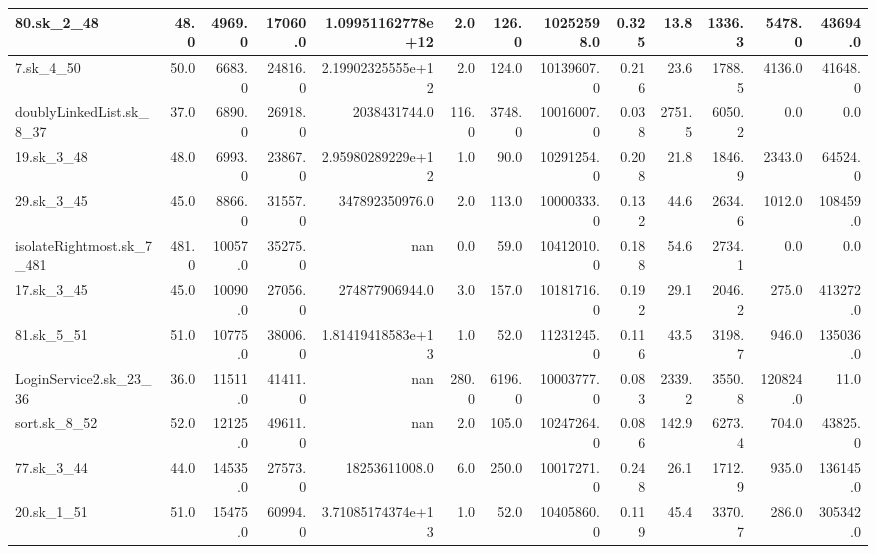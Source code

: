 \begin{tabular}{|l r r r r| r r r r r r | r r|}
\hline
80.sk\_2\_48 & 48.0 & 4969.0 & 17060.0 & 1.09951162778e+12 & 2.0 & 126.0 & 10252598.0 & 0.325 & 13.8 & 1336.3 & 5478.0 & 43694.0 \\
\hline
7.sk\_4\_50 & 50.0 & 6683.0 & 24816.0 & 2.19902325555e+12 & 2.0 & 124.0 & 10139607.0 & 0.216 & 23.6 & 1788.5 & 4136.0 & 41648.0 \\
\hline
doublyLinkedList.sk\_8\_37 & 37.0 & 6890.0 & 26918.0 & 2038431744.0 & 116.0 & 3748.0 & 10016007.0 & 0.038 & 2751.5 & 6050.2 & 0.0 & 0.0 \\
\hline
19.sk\_3\_48 & 48.0 & 6993.0 & 23867.0 & 2.95980289229e+12 & 1.0 & 90.0 & 10291254.0 & 0.208 & 21.8 & 1846.9 & 2343.0 & 64524.0 \\
\hline
29.sk\_3\_45 & 45.0 & 8866.0 & 31557.0 & 347892350976.0 & 2.0 & 113.0 & 10000333.0 & 0.132 & 44.6 & 2634.6 & 1012.0 & 108459.0 \\
\hline
isolateRightmost.sk\_7\_481 & 481.0 & 10057.0 & 35275.0 & nan & 0.0 & 59.0 & 10412010.0 & 0.188 & 54.6 & 2734.1 & 0.0 & 0.0 \\
\hline
17.sk\_3\_45 & 45.0 & 10090.0 & 27056.0 & 274877906944.0 & 3.0 & 157.0 & 10181716.0 & 0.192 & 29.1 & 2046.2 & 275.0 & 413272.0 \\
\hline
81.sk\_5\_51 & 51.0 & 10775.0 & 38006.0 & 1.81419418583e+13 & 1.0 & 52.0 & 11231245.0 & 0.116 & 43.5 & 3198.7 & 946.0 & 135036.0 \\
\hline
LoginService2.sk\_23\_36 & 36.0 & 11511.0 & 41411.0 & nan & 280.0 & 6196.0 & 10003777.0 & 0.083 & 2339.2 & 3550.8 & 120824.0 & 11.0 \\
\hline
sort.sk\_8\_52 & 52.0 & 12125.0 & 49611.0 & nan & 2.0 & 105.0 & 10247264.0 & 0.086 & 142.9 & 6273.4 & 704.0 & 43825.0 \\
\hline
77.sk\_3\_44 & 44.0 & 14535.0 & 27573.0 & 18253611008.0 & 6.0 & 250.0 & 10017271.0 & 0.248 & 26.1 & 1712.9 & 935.0 & 136145.0 \\
\hline
20.sk\_1\_51 & 51.0 & 15475.0 & 60994.0 & 3.71085174374e+13 & 1.0 & 52.0 & 10405860.0 & 0.119 & 45.4 & 3370.7 & 286.0 & 305342.0 \\
\hline
\end{tabular}